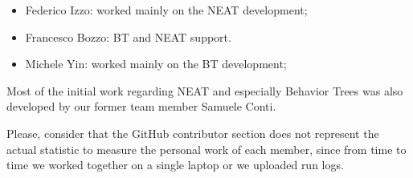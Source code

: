 \begin{itemize}
    \item Federico Izzo: worked mainly on the NEAT development;
    \item Francesco Bozzo: BT and NEAT support.
    \item Michele Yin: worked mainly on the BT development;
\end{itemize}

Most of the initial work regarding NEAT and especially Behavior Trees was also developed by our former team member Samuele Conti.

Please, consider that the GitHub contributor section does not represent the actual statistic to measure the personal work of each member, since from time to time we worked together on a single laptop or we uploaded run logs.

